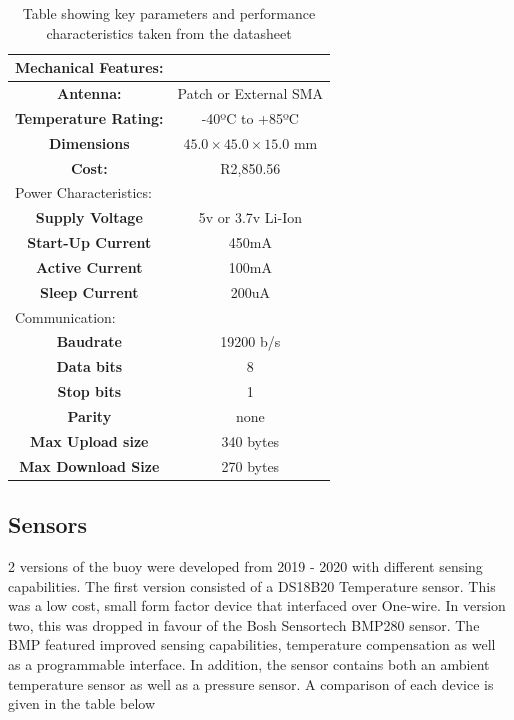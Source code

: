 \begin{table}[H]
	\centering
	\caption{Table showing key parameters and performance characteristics taken from the datasheet}
	\begin{tabular}{|c|c|}
		\multicolumn{2}{l}{Mechanical Features:}\\
		\hline
		\textbf{Antenna: } & Patch or External SMA\\
		\hline
		\textbf{Temperature Rating:} & -40ºC to +85ºC\\
		\hline
		\textbf{Dimensions}  & $45.0 \times 45.0 \times 15.0$ mm  \\
		\hline
		\textbf{Cost: } & R2,850.56\\
		\hline
		\multicolumn{2}{l}{Power Characteristics:}\\
		\hline
		\textbf{Supply Voltage} & 5v or 3.7v Li-Ion \\
		\hline
		\textbf{Start-Up Current} & 450mA \\
		\hline
		\textbf{Active Current} & 100mA \\
		\hline
		\textbf{Sleep Current} & 200uA\\
		\hline
		\multicolumn{2}{l}{Communication:}\\
		\hline
		\textbf{Baudrate} & 19200 b/s \\
		\hline
		\textbf{ Data bits} &  8\\
		\hline
		\textbf{Stop bits} & 1 \\
		\hline
		\textbf{Parity} & none \\
		\hline
		\textbf{Max Upload size} & 340 bytes \\
		\hline
		\textbf{Max Download Size} & 270 bytes \\
		\hline
	\end{tabular}
	
	\label{tab:ir_specs}
\end{table}

\subsection{Sensors}

2 versions of the buoy were developed from 2019 - 2020 with different sensing capabilities. The first version consisted of a DS18B20 Temperature sensor. This was a low cost, small form factor device that interfaced over One-wire. In version two, this was dropped in favour of the Bosh Sensortech BMP280 sensor. The BMP featured improved sensing capabilities, temperature compensation as well as a programmable interface. In addition, the sensor contains both an ambient temperature sensor as well as a pressure sensor. A comparison of each device is given in the table below

